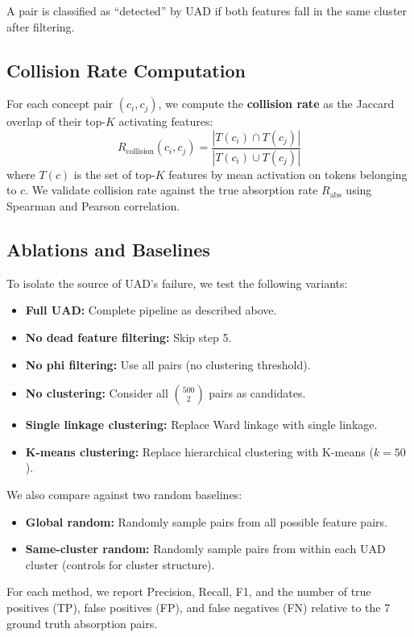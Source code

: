 \documentclass{article}
\begin{document}
A pair is classified as ``detected'' by UAD if both features fall in the same cluster after filtering.

\subsection{Collision Rate Computation}

For each concept pair $(c_i, c_j)$, we compute the \textbf{collision rate} as the Jaccard overlap of their top-$K$ activating features:
\begin{equation}
R_{\text{collision}}(c_i, c_j) = \frac{|T(c_i) \cap T(c_j)|}{|T(c_i) \cup T(c_j)|}
\end{equation}
where $T(c)$ is the set of top-$K$ features by mean activation on tokens belonging to $c$. We validate collision rate against the true absorption rate $R_{\text{abs}}$ using Spearman and Pearson correlation.

\subsection{Ablations and Baselines}

To isolate the source of UAD's failure, we test the following variants:
\begin{itemize}
\item \textbf{Full UAD:} Complete pipeline as described above.
\item \textbf{No dead feature filtering:} Skip step 5.
\item \textbf{No phi filtering:} Use all pairs (no clustering threshold).
\item \textbf{No clustering:} Consider all $\binom{500}{2}$ pairs as candidates.
\item \textbf{Single linkage clustering:} Replace Ward linkage with single linkage.
\item \textbf{K-means clustering:} Replace hierarchical clustering with K-means ($k = 50$).
\end{itemize}

We also compare against two random baselines:
\begin{itemize}
\item \textbf{Global random:} Randomly sample pairs from all possible feature pairs.
\item \textbf{Same-cluster random:} Randomly sample pairs from within each UAD cluster (controls for cluster structure).
\end{itemize}

For each method, we report Precision, Recall, F1, and the number of true positives (TP), false positives (FP), and false negatives (FN) relative to the 7 ground truth absorption pairs.
\end{document}
